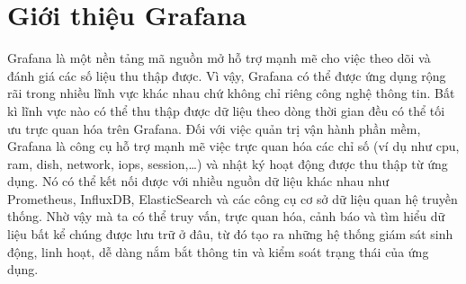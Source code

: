 \section{Giới thiệu Grafana}
Grafana là một nền tảng mã nguồn mở hỗ trợ mạnh mẽ cho việc theo dõi và đánh giá các số liệu thu thập được. Vì vậy, Grafana có thể được ứng dụng rộng rãi trong nhiều lĩnh vực khác nhau chứ không chỉ riêng công nghệ thông tin. Bất kì lĩnh vực nào có thể thu thập được dữ liệu theo dòng thời gian đều có thể tối ưu trực quan hóa trên Grafana.
Đối với việc quản trị vận hành phần mềm, Grafana là công cụ hỗ trợ mạnh mẽ việc trực quan hóa các chỉ số (ví dụ như cpu, ram, dish, network, iops, session,…) và nhật ký hoạt động được thu thập từ ứng dụng. Nó có thể kết nối được với nhiều nguồn dữ liệu khác nhau như Prometheus, InfluxDB, ElasticSearch và các công cụ cơ sở dữ liệu quan hệ truyền thống. Nhờ vậy mà ta có thể truy vấn, trực quan hóa, cảnh báo và tìm hiểu dữ liệu bất kể chúng được lưu trữ ở đâu, từ đó tạo ra những hệ thống giám sát sinh động, linh hoạt, dễ dàng nắm bắt thông tin và kiểm soát trạng thái của ứng dụng. 

